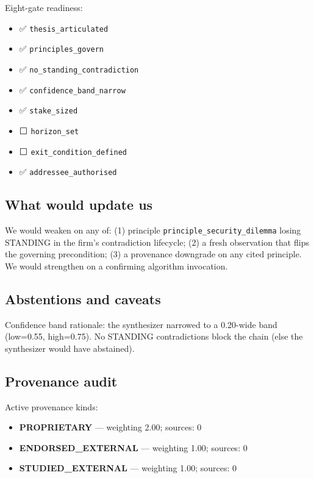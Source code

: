 Eight-gate readiness:
\begin{itemize}
\item ✅ \texttt{thesis\_articulated}
\item ✅ \texttt{principles\_govern}
\item ✅ \texttt{no\_standing\_contradiction}
\item ✅ \texttt{confidence\_band\_narrow}
\item ✅ \texttt{stake\_sized}
\item ⬜ \texttt{horizon\_set}
\item ⬜ \texttt{exit\_condition\_defined}
\item ✅ \texttt{addressee\_authorised}
\end{itemize}

\subsection*{What would update us}
We would weaken on any of: (1) principle \texttt{principle\_security\_dilemma} losing STANDING in the firm's contradiction lifecycle; (2) a fresh observation that flips the governing precondition; (3) a provenance downgrade on any cited principle. We would strengthen on a confirming algorithm invocation.

\subsection*{Abstentions and caveats}
Confidence band rationale: the synthesizer narrowed to a 0.20-wide band (low=0.55, high=0.75). No STANDING contradictions block the chain (else the synthesizer would have abstained).

\subsection*{Provenance audit}
Active provenance kinds:
\begin{itemize}
\item \textbf{PROPRIETARY} — weighting 2.00; sources: 0
\item \textbf{ENDORSED\_EXTERNAL} — weighting 1.00; sources: 0
\item \textbf{STUDIED\_EXTERNAL} — weighting 1.00; sources: 0
\end{itemize}


